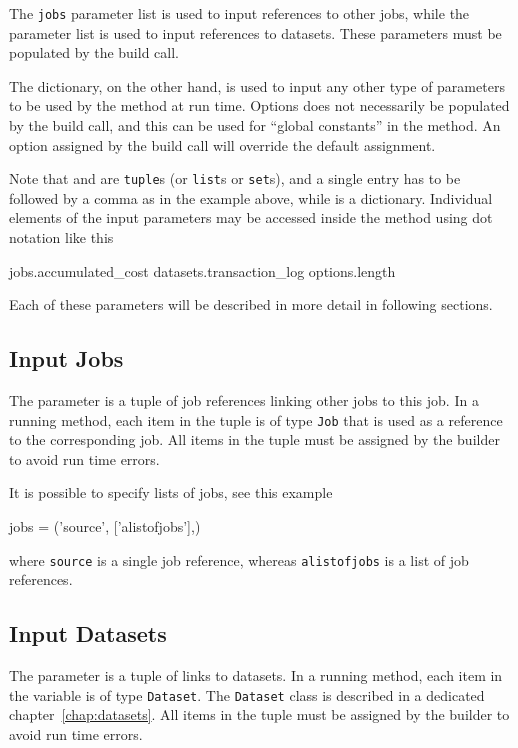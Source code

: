 The \texttt{jobs} parameter list is used to input references to
other jobs, while the \datasets parameter list is used to input
references to datasets.  These parameters must be populated by the
build call.

The \options dictionary, on the other hand, is used to input any other
type of parameters to be used by the method at run time.  Options does
not necessarily be populated by the build call, and this can be used
for ``global constants'' in the method.  An option assigned by the
build call will override the default assignment.

Note that \jobs and \datasets are \texttt{tuple}s (or \texttt{list}s
or \texttt{set}s), and a single entry has to be followed by a comma as
in the example above, while \options is a dictionary.  Individual
elements of the input parameters may be accessed inside the method
using dot notation like this
\begin{python}
jobs.accumulated_cost
datasets.transaction_log
options.length
\end{python}
Each of these parameters will be described in more detail in following
sections.


\subsection{Input Jobs}
The \jobs parameter is a tuple of job references linking other jobs
to this job.  In a running method, each item in the \jobs tuple is
of type \texttt{Job} that is used as a reference to the corresponding
job.  All items in the \jobs tuple must be assigned by the builder
to avoid run time errors.

It is possible to specify lists of jobs, see this example
\begin{python}
jobs = ('source', ['alistofjobs'],)
\end{python}
where \texttt{source} is a single job reference, whereas
\texttt{alistofjobs} is a list of job references.


\subsection{Input Datasets}
The \datasets parameter is a tuple of links to datasets.  In a running
method, each item in the \datasets variable is of type
\texttt{Dataset}.  The \texttt{Dataset} class is described in a
dedicated chapter~\ref{chap:datasets}.  All items in the \datasets
tuple must be assigned by the builder to avoid run time errors.

